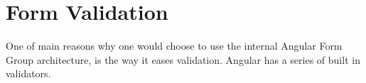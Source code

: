 \chapter{ Form Validation }

One of main reasons why one would choose to use the internal Angular Form 
Group architecture, is the way it eases validation. Angular has a series 
of built in validators. 